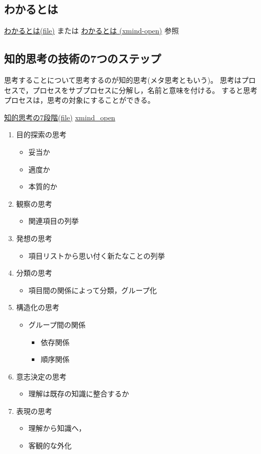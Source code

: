 \documentclass[dvipdfmx,11pat]{jarticle}
\begin{document}
\subsection{わかるとは}
\label{sec:org8279cd0}
\href{../Maps/わかるとは.xmind}{わかるとは(file)} または
\href{shell:xmind ../Maps/わかるとは.xmind}{わかるとは (xmind-open)}
参照
\subsection{知的思考の技術の7つのステップ}
\label{sec:orgf777b9e}
思考することについて思考するのが知的思考(メタ思考ともいう)。
思考はプロセスで，プロセスをサブプロセスに分解し，名前と意味を付ける。
すると思考プロセスは，思考の対象にすることができる。

\href{../Maps/知的思考の7段階.xmind}{知的思考の7段階(file)} \href{shell:xmind ../Maps/知的思考の7段階.xmind}{xmind\_open}

\begin{enumerate}
\item 目的探索の思考
\begin{itemize}
\item 妥当か
\item 適度か
\item 本質的か
\end{itemize}
\item 観察の思考
\begin{itemize}
\item 関連項目の列挙
\end{itemize}
\item 発想の思考
\begin{itemize}
\item 項目リストから思い付く新たなことの列挙
\end{itemize}
\item 分類の思考
\begin{itemize}
\item 項目間の関係によって分類，グループ化
\end{itemize}
\item 構造化の思考
\begin{itemize}
\item グループ間の関係
\begin{itemize}
\item 依存関係
\item 順序関係
\end{itemize}
\end{itemize}
\item 意志決定の思考
\begin{itemize}
\item 理解は既存の知識に整合するか
\end{itemize}
\item 表現の思考
\begin{itemize}
\item 理解から知識へ，
\item 客観的な外化
\end{itemize}
\end{enumerate}
\end{document}
